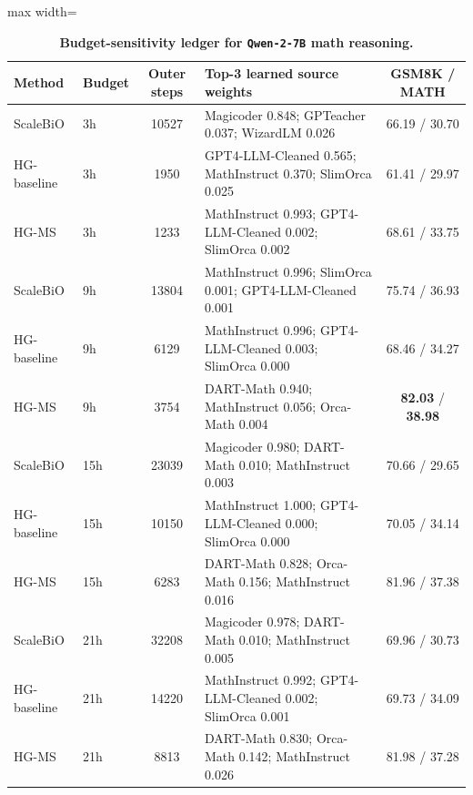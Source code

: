 \documentclass{article}
\theoremstyle{normaltheorem}
\begin{document}
\begin{table}[t]
  \centering
  \caption{\textbf{Budget-sensitivity ledger for \texttt{Qwen-2-7B} math reasoning.}}
  \label{tab:llm-budget-sensitivity-qwen}
  \begin{adjustbox}{max width=\textwidth}
  \begin{tabular}{llclc}
    \toprule
    Method & Budget & Outer steps & Top-3 learned source weights & GSM8K / MATH \\
    \midrule
    ScaleBiO  & 3h  & 10527 & Magicoder 0.848; GPTeacher 0.037; WizardLM 0.026 & 66.19 / 30.70 \\
    HG-baseline & 3h  & 1950  & GPT4-LLM-Cleaned 0.565; MathInstruct 0.370; SlimOrca 0.025 & 61.41 / 29.97 \\
    HG-MS     & 3h  & 1233  & MathInstruct 0.993; GPT4-LLM-Cleaned 0.002; SlimOrca 0.002 & 68.61 / 33.75 \\
    \midrule
    ScaleBiO  & 9h  & 13804 & MathInstruct 0.996; SlimOrca 0.001; GPT4-LLM-Cleaned 0.001 & 75.74 / 36.93 \\
    HG-baseline & 9h  & 6129  & MathInstruct 0.996; GPT4-LLM-Cleaned 0.003; SlimOrca 0.000 & 68.46 / 34.27 \\
    HG-MS     & 9h  & 3754  & DART-Math 0.940; MathInstruct 0.056; Orca-Math 0.004 & \textbf{82.03} / \textbf{38.98} \\
    \midrule
    ScaleBiO  & 15h & 23039 & Magicoder 0.980; DART-Math 0.010; MathInstruct 0.003 & 70.66 / 29.65 \\
    HG-baseline & 15h & 10150 & MathInstruct 1.000; GPT4-LLM-Cleaned 0.000; SlimOrca 0.000 & 70.05 / 34.14 \\
    HG-MS     & 15h & 6283  & DART-Math 0.828; Orca-Math 0.156; MathInstruct 0.016 & 81.96 / 37.38 \\
    \midrule
    ScaleBiO  & 21h & 32208 & Magicoder 0.978; DART-Math 0.010; MathInstruct 0.005 & 69.96 / 30.73 \\
    HG-baseline & 21h & 14220 & MathInstruct 0.992; GPT4-LLM-Cleaned 0.002; SlimOrca 0.001 & 69.73 / 34.09 \\
    HG-MS     & 21h & 8813  & DART-Math 0.830; Orca-Math 0.142; MathInstruct 0.026 & 81.98 / 37.28 \\
    \bottomrule
  \end{tabular}
  \end{adjustbox}
\end{table}
\end{document}
